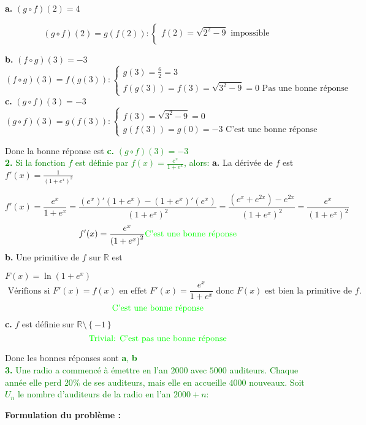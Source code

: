\documentclass[12pt]{article}
\begin{document}
\textbf{a.} $(g\circ f)(2)=4$

\[
(g\circ f)(2)=g(f(2)):
\begin{cases}
f(2)=\sqrt{2^{2}-9} \text{ impossible }\\
\end{cases}
\]

\textbf{b.} $(f\circ g)(3)=-3$
 \[
(f\circ g)(3)=f(g(3)):
\begin{cases}
g(3)=\frac{6}{2}=3\\
f(g(3))=f(3)=\sqrt{3^{2}-9}=0 \text{ Pas une bonne réponse }
\end{cases}
\]
\textbf{c.} $(g\circ f)(3)=-3$
\[
(g\circ f)(3)=g(f(3)):
\begin{cases}
f(3)=\sqrt{3^{2}-9}=0\\
g(f(3))=g(0)=-3 \text{ C'est une bonne réponse }
\end{cases}
\]

Donc la bonne réponse est \textcolor{green}{\textbf{c.} $(g\circ f)(3)=-3$}\\

\textcolor{green}{ \textbf{2.} Si la fonction $f$ est définie par $f(x)=\frac{e^{x}}{1+e^{x}}$, alors: }
\newpage
\textbf{a.} La dérivée de $f$ est $f'(x)=\frac{1}{\left(1+e^{x}\right)^{2}}$

\[
f'(x)=\frac{e^{x}}{1+e^{x}}=\frac{(e^{x})'(1+e^{x})-(1+e^{x})'(e^{x})}{\left( 1+e^{x} \right)^{2}  }=\frac{(e^{x}+e^{2x})-e^{2x}}{\left( 1+e^{x} \right)^{2}}=\frac{e^{x}}{\left( 1+e^{x} \right)^{2}}
\]
\[f'(x)=\frac{e^{x}}{\left( 1+e^{x} \right)^{2}} \text{\textcolor{green} {C'est une bonne réponse }}\]
\textbf{b.} Une primitive de $f$ sur $\mathbb{R}$ est

$F(x)=\ln(1+e^{x})$
\[\text{ Vérifions si } F'(x)=f(x) \text{ en effet } F'(x)=\frac{e^{x}}{1+e^{x}} \text{ donc } F(x) \text{ est bien la primitive de } f. \]
\[\text{\textcolor{green} {C'est une bonne réponse }}\]
\textbf{c.} $f$ est définie sur $\mathbb{R}\setminus\left\lbrace -1\right\rbrace $
\[\text{\textcolor{green} {Trivial: C'est pas une bonne réponse }}\]

Donc les bonnes réponses sont \textcolor{green}{\textbf{a}, \textbf{b}}\\

\textcolor{green}{\textbf{3.} Une radio a commencé à émettre en l'an $2000$ avec $5000$ auditeurs. Chaque année elle perd  $20\%$ de ses auditeurs, mais elle en accueille $4000$ nouveaux. Soit $U_{n}$ le nombre d'auditeurs de la radio en  l'an $2000+n$:} 

\textbf{Formulation du problème :}
\end{document}
